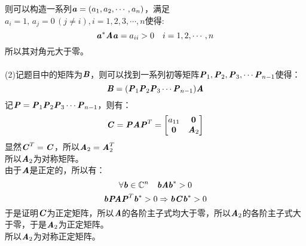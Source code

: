 \documentclass{article}
\newcommand{\xc}[1]{\textbf{\emph{#1}}}
\begin{document}
\begin{itemize}
$$		$$
		则可以构造一系列$\xc{a} = (a_1, a_2, \cdots, a_n)$，满足$a_i = 1,\, a_j = 0\,(j\ne i), i = 1, 2, 3, \cdots, n$使得:
		$$
				\xc{a}^{*}\xc{A}\xc{a} = a_{ii} > 0\quad i = 1, 2, \cdots, n
		$$
		所以其对角元大于零。\\
		\\
		(2)记题目中的矩阵为$\xc{B}$，则可以找到一系列初等矩阵$\xc{P}_1,\xc{P}_2,\xc{P}_3, \cdots\xc{P}_{n-1}$使得：
		$$
			\xc{B} = (\xc{P}_1\xc{P}_2\xc{P}_3\cdots\xc{P}_{n-1})\xc{A}
		$$
		记$\xc{P} =\xc{P}_1\xc{P}_2\xc{P}_3\cdots\xc{P}_{n-1}$，则有：
		$$
			\xc{C} = \xc{P}\xc{A}\xc{P}^{T} = 
			\begin{bmatrix}
			a_{11} & \textbf{0}\\
			\textbf{0} & \xc{A}_2
			\end{bmatrix}
		$$
		显然$\xc{C}^{T} = \xc{C}$，所以$\xc{A}_2 = \xc{A}_2^T$\\
		所以$\xc{A}_2$为对称矩阵。\\
		由于$\xc{A}$是正定的，所以有：
		$$
			\forall \xc{b} \in \mathbb{C}^{n}\quad\xc{bAb}^{*} > 0
		$$
		$$
			\xc{b}\xc{PAP}^{T}\xc{b}^{*} > 0 \Rightarrow 	\xc{b}\xc{C}\xc{b}^{*} > 0
		$$
		于是证明$\xc{C}$为正定矩阵，所以$\xc{A}$的各阶主子式均大于零，所以$\xc{A}_2$的各阶主子式大于零，于是$\xc{A}_2$为正定矩阵。\\
		所以$\xc{A}_2$为对称正定矩阵。\\
		\\
		

\end{itemize}
\end{document}

